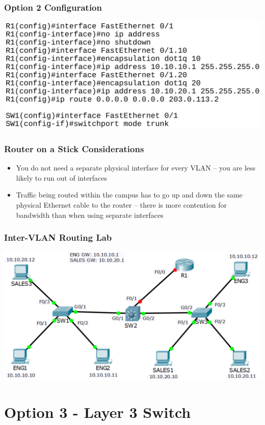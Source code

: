 \documentclass[pdflatex,compress,mathserif]{beamer}
\begin{document}
\begin{frame}
	\frametitle{Option 2 Configuration}
	\begin{center}
		\includegraphics[width=\linewidth]{img/img05}
	\end{center}
\end{frame}

\begin{frame}
	\frametitle{Router on a Stick Considerations}
	\begin{itemize}
		\item You do not need a separate physical interface for every VLAN – you are
less likely to run out of interfaces
		\item Traffic being routed within the campus has to go up and down the
same physical Ethernet cable to the router – there is more contention
for bandwidth than when using separate interfaces
	\end{itemize}
\end{frame}

\begin{frame}
	\frametitle{Inter-VLAN Routing Lab}
	\begin{center}
		\includegraphics[width=\linewidth]{img/img06}
	\end{center}
\end{frame}

\section{Option 3 - Layer 3 Switch}
\end{document}
